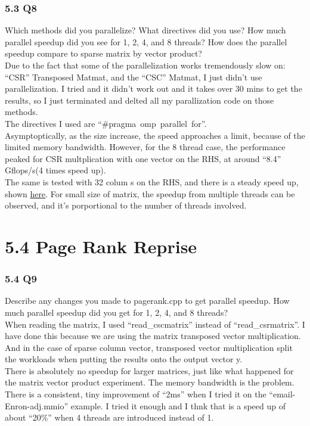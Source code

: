 \documentclass[]{article}
\begin{document}
    \subsubsection*{5.3 Q8}
    Which methods did you parallelize? What directives did you use? How much parallel speedup did you see for 1, 2, 4, and 8 threads? How does the parallel speedup compare to sparse matrix by vector product?
    \\[1.1em]
    Due to the fact that some of the parallelization works tremendously slow on: ``CSR'' Transposed Matmat, and the ``CSC'' Matmat, I just didn't use parallelization. I tried and it didn't work out and it takes over 30 mins to get the results, so I just terminated and delted all my parallization code on those methods.  
    \\
    The directives I used are ``\#pragma\ omp\ parallel\ for''. 
    \\
    Asymptoptically, as the size increase, the speed approaches a limit, because of the limited memory bandwidth. However, for the 8 thread case, the performance peaked for CSR multplication with one vector on the RHS, at around ``8.4'' Gflops/s(4 times speed up). 
    \\
    The same is tested with 32 colum s on the RHS, and there is a steady speed up, shown \hyperref[5.3.2.appendix]{here}. For small size of matrix, the speedup from multiple threads can be observed, and it's porportional to the number of threads involved.

\section*{5.4 Page Rank Reprise}
    \subsubsection*{5.4 Q9}
    Describe any changes you made to pagerank.cpp to get parallel speedup. How much parallel speedup did you get for 1, 2, 4, and 8 threads?
    \\[1.1em]
    When reading the matrix, I used ``read\_cscmatrix'' instead of ``read\_csrmatrix''. I have done this because we are using the matrix transposed vector multiplication. And in the case of sparse column vector, transposed vector multiplication split the workloads when putting the results onto the output vector y.
    \\
    There is absolutely no speedup for larger matrices, just like what happened for the matrix vector product experiment. The memory bandwidth is the problem. 
    \\
    There is a consistent, tiny improvement of ``2ms'' when I tried it on the ``email-Enron-adj.mmio'' example. I tried it enough and I thnk that is a speed up of about ``20\%'' when 4 threads are introduced instead of 1. 
\end{document}
